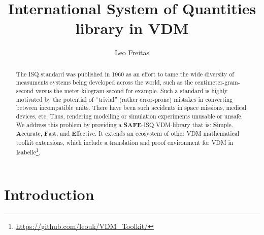 \documentclass[runningheads,a4paper]{llncs}
\begin{document}
%



\title{International System of Quantities library in VDM}

\author{Leo Freitas
}
\authorrunning{ }

			
\maketitle
\setcounter{footnote}{0} 
\begin{abstract}
    The \gls{ISQ} standard was published in 1960 as an effort to tame the wide diversity of measuments systems being developed across the world, such as the centimeter-gram-second versus the meter-kilogram-second for example. Such a standard is highly motivated by the potential of ``trivial'' (rather error-prone) mistakes in converting between incompatible units. There have been such accidents in space missions, medical devices, etc. Thus, rendering modelling or simulation experiments unusable or unsafe. We address this problem by providing a \textbf{SAFE}-ISQ VDM-library that is: \textbf{S}imple, \textbf{A}ccurate, \textbf{F}ast, and \textbf{E}ffective. It extends an ecosystem of other VDM mathematical toolkit extensions, which include a translation and proof environment for VDM in Isabelle\footnote{\url{https://github.com/leouk/VDM_Toolkit/}}.
\end{abstract}


\section{Introduction}\label{sec:intro}
\end{document}
